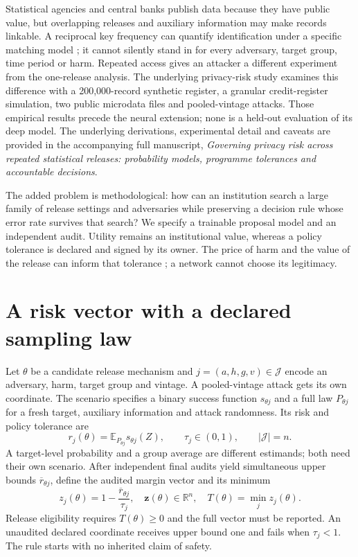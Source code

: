 \documentclass[10pt,a4paper]{article}
\theoremstyle{plain}
\newcommand{\E}{\mathbb E}
\begin{document}
Statistical agencies and central banks publish data because they have public
value, but overlapping releases and auxiliary information may make records
linkable. A reciprocal key frequency can quantify identification under a
specific matching model \citep{fellegi1969}; it cannot silently stand in for
every adversary, target group, time period or harm. Repeated access gives an
attacker a different experiment from the one-release analysis. The underlying
privacy-risk study examines this difference with a 200,000-record synthetic
register, a granular credit-register simulation, two public microdata files and
pooled-vintage attacks. Those empirical results precede the neural extension;
none is a held-out evaluation of its deep model. The underlying derivations,
experimental detail and caveats are provided in the accompanying full
manuscript, \emph{Governing privacy risk across repeated statistical releases:
probability models, programme tolerances and accountable decisions}.

The added problem is methodological: how can an institution search a large
family of release settings and adversaries while preserving a decision rule
whose error rate survives that search? We specify a trainable proposal model
and an independent audit. Utility remains an institutional value, whereas a
policy tolerance is declared and signed by its owner. The price of harm and
the value of the release can inform that tolerance \citep{abowd2019}; a
network cannot choose its legitimacy.

\section{A risk vector with a declared sampling law}

Let $\theta$ be a candidate release mechanism and
$j=(a,h,g,v)\in\mathcal J$ encode an adversary, harm, target group and
vintage. A pooled-vintage attack gets its own coordinate. The scenario
specifies a binary success function $s_{\theta j}$ and a full law
$P_{\theta j}$ for a fresh target, auxiliary information and attack
randomness. Its risk and policy tolerance are
\begin{equation}
 r_j(\theta)=\E_{P_{\theta j}}s_{\theta j}(Z),\qquad
 \tau_j\in(0,1),\qquad |\mathcal J|=n.
 \label{eq:ifc-risk}
\end{equation}
A target-level probability and a group average are different estimands;
both need their own scenario. After independent final audits yield simultaneous
upper bounds $\overline r_{\theta j}$, define the audited margin vector and
its minimum
\begin{equation}
 z_j(\theta)=1-\frac{\overline r_{\theta j}}{\tau_j},\quad
 \boldsymbol z(\theta)\in\mathbb R^n,\quad
 T(\theta)=\min_j z_j(\theta).
 \label{eq:ifc-position}
\end{equation}
Release eligibility requires $T(\theta)\geq0$ and the full vector must be
reported. An unaudited declared coordinate receives upper bound one and fails
when $\tau_j<1$. The rule starts with no inherited claim of safety.
\end{document}
